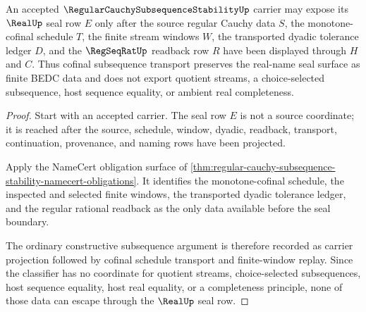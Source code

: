 \begin{theorem}
\label{thm:regular-cauchy-subsequence-stability-real-seal-boundary}
An accepted $\RegularCauchySubsequenceStabilityUp$ carrier may expose its $\RealUp$ seal row $E$ only after the source regular Cauchy data $S$, the monotone-cofinal schedule $T$, the finite stream windows $W$, the transported dyadic tolerance ledger $D$, and the $\RegSeqRatUp$ readback row $R$ have been displayed through $H$ and $C$. Thus cofinal subsequence transport preserves the real-name seal surface as finite BEDC data and does not export quotient streams, a choice-selected subsequence, host sequence equality, or ambient real completeness.
\end{theorem}
\begin{proof}
Start with an accepted carrier. The seal row $E$ is not a source coordinate; it is reached after the source, schedule, window, dyadic, readback, transport, continuation, provenance, and naming rows have been projected.

Apply the NameCert obligation surface of \autoref{thm:regular-cauchy-subsequence-stability-namecert-obligations}. It identifies the monotone-cofinal schedule, the inspected and selected finite windows, the transported dyadic tolerance ledger, and the regular rational readback as the only data available before the seal boundary.

The ordinary constructive subsequence argument is therefore recorded as carrier projection followed by cofinal schedule transport and finite-window replay. Since the classifier has no coordinate for quotient streams, choice-selected subsequences, host sequence equality, host real equality, or a completeness principle, none of those data can escape through the $\RealUp$ seal row.
\end{proof}


